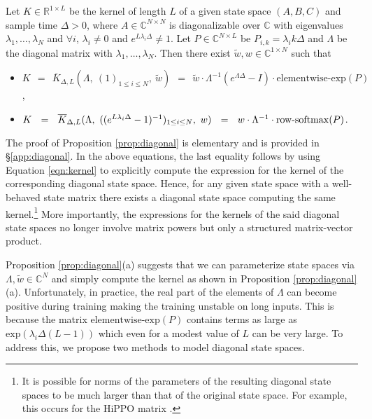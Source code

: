 \begin{proposition}\label{prop:diagonal} Let $K \in \mathbb{R}^{1\times L}$ be the kernel of length $L$ of a given state space $(A, B, C)$ and sample time $\Delta > 0$, where $A \in \mathbb{C}^{N \times N}$ is diagonalizable over $\mathbb{C}$ with eigenvalues $\lambda_1,\ldots,\lambda_N$ and $\forall i$, $\lambda_i \neq 0$ and $e^{L\lambda_i\Delta} \neq 1$. Let $P \in \mathbb{C}^{N \times L}$ be $P_{i,k} = \lambda_i k\Delta$ and $\Lambda$ be the diagonal matrix with $\lambda_1,\ldots,\lambda_N$. Then there exist $\widetilde{w}, w \in \mathbb{C}^{1\times N}$ such that
\begin{itemize}
    \item[(a)] $K\ \ =\ \ \overline{K}_{\Delta, L}(\Lambda,\ (1)_{1 \leq i \leq N},\ \widetilde{w})\ \ =\ \ \widetilde{w} \cdot \Lambda^{-1} (e^{\Lambda\Delta} - I) \cdot \mathrm{elementwise}\text{-}\mathrm{exp}(P)$,
    \item[(b)] $K\ \ =\ \ \overline{K}_{\Delta, L}(\Lambda,\ ((e^{L\lambda_i\Delta} - 1)^{-1})_{1\leq i \leq N},\ w)\ \ =\ \ w \cdot \Lambda^{-1} \cdot \mathrm{row}{\text -}\mathrm{softmax}(P)$.

\end{itemize}
\end{proposition}

The proof of Proposition \ref{prop:diagonal} is elementary and is provided in \S\ref{app:diagonal}. In the above equations, the last equality follows by using Equation \ref{eqn:kernel} to explicitly compute the expression for the kernel of the corresponding diagonal state space. Hence, for any given state space with a well-behaved state matrix there exists a diagonal state space computing the same kernel.\footnote{It is possible for norms of the parameters of the resulting diagonal state spaces to be much larger than that of the original state space. For example, this occurs for the HiPPO matrix \cite{gu2022efficiently}.} More importantly, the expressions for the kernels of the said diagonal state spaces no longer involve matrix powers but only a structured matrix-vector product. 

Proposition \ref{prop:diagonal}(a) suggests that we can parameterize state spaces via $\Lambda, \widetilde{w} \in \mathbb{C}^N$ and simply compute the kernel as shown in Proposition \ref{prop:diagonal}(a). Unfortunately, in practice, the real part of the elements of $\Lambda$ can become positive during training making the training unstable on long inputs. This is because the matrix $\mathrm{elementwise}\text{-}\mathrm{exp}(P)$ contains terms as large as $\mathrm{exp}(\lambda_i \Delta (L-1))$ which even for a modest value of $L$ can be very large. To address this, we propose two methods to model diagonal state spaces.

